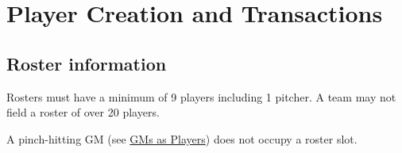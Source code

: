 
\section{Player Creation and Transactions}

\subsection{Roster information}
\begin{deepEnumerate}
	\item Rosters must have a minimum of 9 players including 1 pitcher.
	A team may not field a roster of over 20 players.
	\begin{deepEnumerate}
		\item A pinch-hitting GM (see \hyperref[sec:GMs as Players]{GMs as Players})
		does not occupy a roster slot.
	\end{deepEnumerate}
\end{deepEnumerate}


